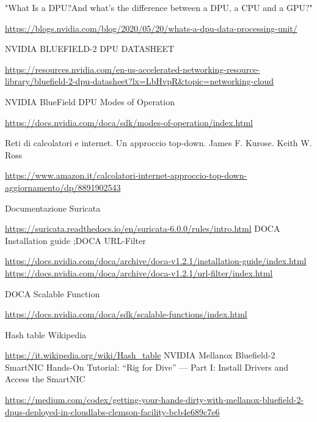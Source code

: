 \documentclass[binding=0.6cm]{sapthesis}
\theoremstyle{definition}
\begin{document}
\begin{thebibliography}{9}
"What Is a DPU?And what’s the difference between a DPU, a CPU and a GPU?"


\url{https://blogs.nvidia.com/blog/2020/05/20/whats-a-dpu-data-processing-unit/}

NVIDIA BLUEFIELD-2 DPU DATASHEET

\url{https://resources.nvidia.com/en-us-accelerated-networking-resource-library/bluefield-2-dpu-datasheet?lx=LbHvpR&topic=networking-cloud}

NVIDIA BlueField DPU Modes of Operation

\url{https://docs.nvidia.com/doca/sdk/modes-of-operation/index.html}

Reti di calcolatori e internet. Un approccio top-down.
James F. Kurose. Keith W. Ross

\url{https://www.amazon.it/calcolatori-internet-approccio-top-down-aggiornamento/dp/8891902543}

Documentazione Suricata

\url{https://suricata.readthedocs.io/en/suricata-6.0.0/rules/intro.html}
DOCA Installation guide ;DOCA URL-Filter

\url{https://docs.nvidia.com/doca/archive/doca-v1.2.1/installation-guide/index.html}\\
\url{https://docs.nvidia.com/doca/archive/doca-v1.2.1/url-filter/index.html}

DOCA Scalable Function

\url{https://docs.nvidia.com/doca/sdk/scalable-functions/index.html}

Hash table Wikipedia

\url{https://it.wikipedia.org/wiki/Hash_table}
NVIDIA Mellanox Bluefield-2 SmartNIC Hands-On Tutorial: “Rig for Dive” — Part I: Install Drivers and Access the SmartNIC

\url{https://medium.com/codex/getting-your-hands-dirty-with-mellanox-bluefield-2-dpus-deployed-in-cloudlabs-clemson-facility-bcb4e689c7e6}



\end{thebibliography}  
\end{document}

